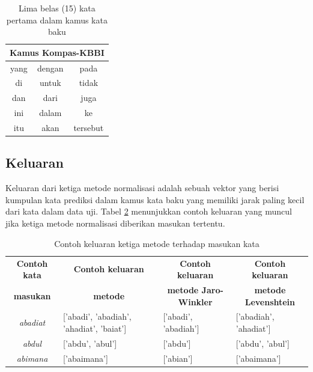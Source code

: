 \begin{table}[H]
    \captionsetup{justification=justified,singlelinecheck=false}
    \caption{Lima belas (15) kata pertama dalam kamus kata baku}
    \label{tbl:dictionary_kbbi-kompas}
    \centering
    \begin{tabular}{|c|c|c|}
        \hline
        \multicolumn{3}{|c|}{\textbf{Kamus Kompas-KBBI}} \\ \hline
        yang & dengan & pada \\
        di & untuk & tidak \\
        dan & dari & juga \\
        ini & dalam & ke \\
        itu & akan & tersebut \\ \hline
    \end{tabular}
\end{table}

\subsection{Keluaran}

Keluaran dari ketiga metode normalisasi adalah sebuah vektor yang berisi kumpulan kata prediksi dalam kamus kata baku yang memiliki jarak paling kecil dari kata dalam data uji. Tabel \ref{tbl:output} menunjukkan contoh keluaran yang muncul jika ketiga metode normalisasi diberikan masukan tertentu.
\begin{table}[ht]
    \captionsetup{justification=justified,singlelinecheck=false}
    \caption{Contoh keluaran ketiga metode terhadap masukan kata}
    \label{tbl:output}
    \centering
    \begin{tabularx}{\textwidth}{|c|X|X|X|}
        \hline
        \textbf{Contoh kata} & \multicolumn{1}{c|}{\textbf{Contoh keluaran}} & \multicolumn{1}{c|}{\textbf{Contoh keluaran}} & \multicolumn{1}{c|}{\textbf{Contoh keluaran}} \\
        \textbf{masukan} & \multicolumn{1}{c|}{\textbf{metode \parencite{saragih2017normalisasi}}} & \multicolumn{1}{c|}{\textbf{metode Jaro-Winkler}} & \multicolumn{1}{c|}{\textbf{metode Levenshtein}} \\ \hline
        \textit{abadiat} & {[}'abadi', 'abadiah', 'ahadiat', 'baiat'] & {[}'abadi', 'abadiah'] & {[}'abadiah', 'ahadiat'] \\ \hline
        \textit{abdul} & {[}'abdu', 'abul'] & {[}'abdu'] & {[}'abdu', 'abul'] \\ \hline
        \textit{abimana} & {[}'abaimana'] & {[}'abian'] & {[}'abaimana'] \\ \hline
    \end{tabularx}
\end{table}

